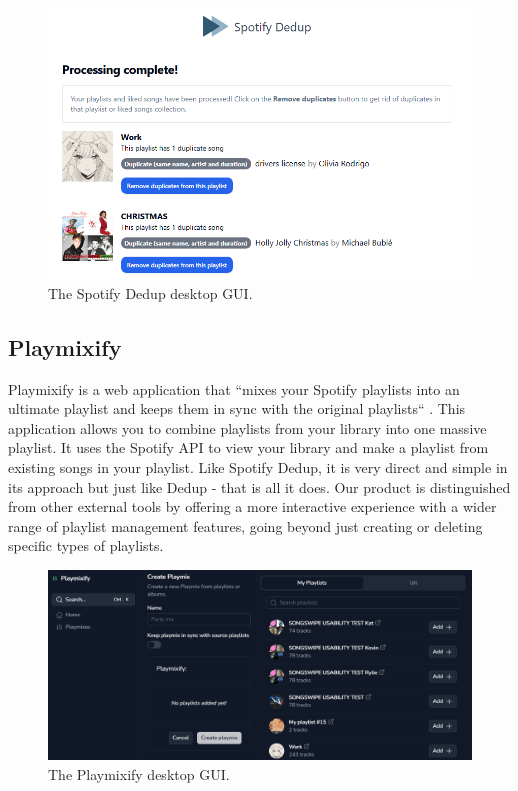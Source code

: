 \documentclass{article}
\begin{document}
\begin{figure}[ht]
  \centering
  \includegraphics[width=\textwidth]{./dedupss.png}
  \caption{The Spotify Dedup desktop GUI.}
  \label{fig:dedup}
\end{figure}

\pagebreak

\subsection{Playmixify}
\quad Playmixify is a web application that ``mixes your Spotify playlists into an ultimate playlist and keeps them in sync with the original playlists`` \cite{Spotify_app}. This application allows you to combine playlists from your library into one massive playlist. It uses the Spotify API to view your library and make a playlist from existing songs in your playlist. Like Spotify Dedup, it is very direct and simple in its approach but just like Dedup - that is all it does. Our product is distinguished from other external tools by offering a more interactive experience with a wider range of playlist management features, going beyond just creating or deleting specific types of playlists.

\begin{figure}[ht]
  \centering
  \includegraphics[width=5 in]{./playmixifyss.png}
  \caption{The Playmixify desktop GUI.}
  \label{fig:playmixify}
\end{figure}
\end{document}
